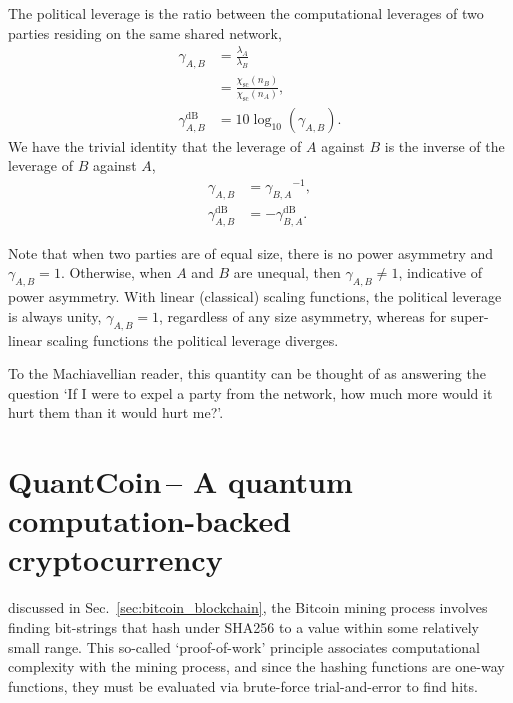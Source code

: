 \begin{definition}
The political leverage is the ratio between the computational leverages of two parties residing on the same shared network,
\begin{align}
	\gamma_{A,B} &= \frac{\lambda_A}{\lambda_B}\nonumber\\
	&= \frac{\chi_\mathrm{sc}(n_B)}{\chi_\mathrm{sc}(n_A)},\nonumber\\
	\gamma_{A,B}^\mathrm{dB} &= 10\log_{10}(\gamma_{A,B}).
\end{align}
We have the trivial identity that the leverage of $A$ against $B$ is the inverse of the leverage of $B$ against $A$,
\begin{align}
	\gamma_{A,B} &= {\gamma_{B,A}}^{-1},\nonumber\\
	\gamma_{A,B}^\mathrm{dB} &= -\gamma_{B,A}^\mathrm{dB}.
\end{align}
\end{definition}
Note that when two parties are of equal size, there is no power asymmetry and \mbox{$\gamma_{A,B}=1$}. Otherwise, when $A$ and $B$ are unequal, then \mbox{$\gamma_{A,B}\neq 1$}, indicative of power asymmetry. With linear (classical) scaling functions, the political leverage is always unity, \mbox{$\gamma_{A,B}=1$}, regardless of any size asymmetry, whereas for super-linear scaling functions the political leverage diverges.

To the Machiavellian reader, this quantity can be thought of as answering the question `If I were to expel a party from the network, how much more would it hurt them than it would hurt me?'.

%
%

\section{QuantCoin\texttrademark\,-- A quantum computation-backed cryptocurrency}\label{sec:quant_coin_technical}

 discussed in Sec.~\ref{sec:bitcoin_blockchain}, the Bitcoin mining process involves finding bit-strings that hash under SHA256 to a value within some relatively small range. This so-called `proof-of-work' principle associates computational complexity with the mining process, and since the hashing functions are one-way functions, they must be evaluated via brute-force trial-and-error to find hits.

